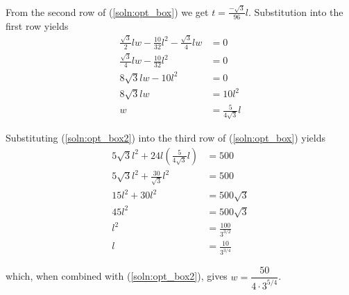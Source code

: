 \documentclass{article}
\begin{document}
\begin{enumerate}
From the second row of (\ref{soln:opt_box}) we get $t = \frac{-\sqrt{3}}{96}l$.
Substitution into the first row yields
\begin{align}
 \frac{\sqrt{3}}{2}lw - \frac{10}{32}l^2 - \frac{\sqrt{3}}{4}lw &= 0 \nonumber \\
 \frac{\sqrt{3}}{4}lw - \frac{10}{32}l^2 &= 0 \nonumber \\
 8\sqrt{3}lw - 10l^2 &= 0 \nonumber \\
 8\sqrt{3}lw &= 10l^2 \nonumber \\
 w &= \frac{5}{4\sqrt{3}}l \label{soln:opt_box2}
\end{align}

Substituting (\ref{soln:opt_box2}) into the third row of (\ref{soln:opt_box})
yields
\begin{align*}
 5\sqrt{3}l^2 + 24l(\frac{5}{4\sqrt{3}}l) &= 500 \\
 5\sqrt{3}l^2 + \frac{30}{\sqrt{3}}l^2 &= 500 \\
 15l^2 + 30l^2 &= 500\sqrt{3} \\
 45l^2 &= 500\sqrt{3} \\
 l^2 &= \frac{100}{3^{3/2}} \\
 l &= \frac{10}{3^{3/4}}
\end{align*}

which, when combined with (\ref{soln:opt_box2}), gives
$w = \dfrac{50}{4\cdot3^{5/4}}$.

\end{enumerate}
\end{document}
